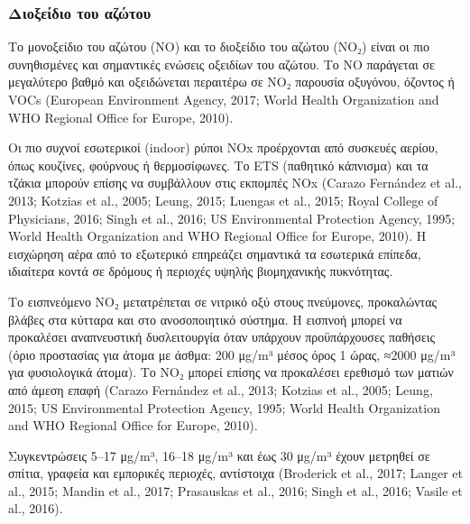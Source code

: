 \cite{GONZALEZMARTIN2021128376}


\subsubsection{Διοξείδιο του αζώτου}

Το μονοξείδιο του αζώτου (NO) και το διοξείδιο του αζώτου (NO₂) είναι οι πιο συνηθισμένες και σημαντικές ενώσεις οξειδίων του αζώτου. Το NO παράγεται σε μεγαλύτερο βαθμό και οξειδώνεται περαιτέρω σε NO₂ παρουσία οξυγόνου, όζοντος ή VOCs (European Environment Agency, 2017; World Health Organization and WHO Regional Office for Europe, 2010).

Οι πιο συχνοί εσωτερικοί (indoor) ρύποι NOx προέρχονται από συσκευές αερίου, όπως κουζίνες, φούρνους ή θερμοσίφωνες. Το ETS (παθητικό κάπνισμα) και τα τζάκια μπορούν επίσης να συμβάλλουν στις εκπομπές NOx (Carazo Fernández et al., 2013; Kotzias et al., 2005; Leung, 2015; Luengas et al., 2015; Royal College of Physicians, 2016; Singh et al., 2016; US Environmental Protection Agency, 1995; World Health Organization and WHO Regional Office for Europe, 2010). Η εισχώρηση αέρα από το εξωτερικό επηρεάζει σημαντικά τα εσωτερικά επίπεδα, ιδιαίτερα κοντά σε δρόμους ή περιοχές υψηλής βιομηχανικής πυκνότητας.

Το εισπνεόμενο NO₂ μετατρέπεται σε νιτρικό οξύ στους πνεύμονες, προκαλώντας βλάβες στα κύτταρα και στο ανοσοποιητικό σύστημα. Η εισπνοή μπορεί να προκαλέσει αναπνευστική δυσλειτουργία όταν υπάρχουν προϋπάρχουσες παθήσεις (όριο προστασίας για άτομα με άσθμα: 200 μg/m³ μέσος όρος 1 ώρας, ≈2000 μg/m³ για φυσιολογικά άτομα). Το NO₂ μπορεί επίσης να προκαλέσει ερεθισμό των ματιών από άμεση επαφή (Carazo Fernández et al., 2013; Kotzias et al., 2005; Leung, 2015; US Environmental Protection Agency, 1995; World Health Organization and WHO Regional Office for Europe, 2010).

Συγκεντρώσεις 5–17 μg/m³, 16–18 μg/m³ και έως 30 μg/m³ έχουν μετρηθεί σε σπίτια, γραφεία και εμπορικές περιοχές, αντίστοιχα (Broderick et al., 2017; Langer et al., 2015; Mandin et al., 2017; Prasauskas et al., 2016; Singh et al., 2016; Vasile et al., 2016).

